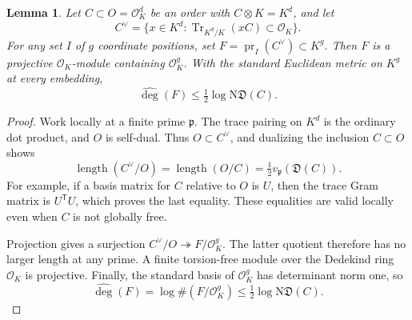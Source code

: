 \documentclass[11pt,a4paper]{article}
\newtheorem{lemma}[theorem]{Lemma}
\theoremstyle{definition}
\newcommand{\OK}{\mathcal O_K}
\newcommand{\Ardeg}{\widehat{\deg}}
\begin{document}
\begin{lemma}\label{lem:trace-lattice}
Let $C\subset O=\OK^d$ be an order with $C\otimes K=K^d$, and
let
\[
 C^\vee=\{x\in K^d:\operatorname{Tr}_{K^d/K}(xC)\subset\OK\}.
\]
For any set $I$ of $g$ coordinate positions, set
$F=\operatorname{pr}_I(C^\vee)\subset K^g$.
Then $F$ is a projective $\OK$-module containing $\OK^g$.
With the standard Euclidean metric on $K^g$ at every embedding,
\[
 \Ardeg(F)\le\tfrac12\log\mathrm N\mathfrak D(C).
\]
\end{lemma}
\begin{proof}
Work locally at a finite prime $\mathfrak p$. The trace pairing
on $K^d$ is the ordinary dot product, and $O$ is self-dual.
Thus $O\subset C^\vee$, and dualizing the inclusion $C\subset O$
shows
\[
 \operatorname{length}(C^\vee/O)
 =\operatorname{length}(O/C)
 =\tfrac12v_{\mathfrak p}(\mathfrak D(C)).
\]
For example, if a basis matrix for $C$ relative to $O$ is $U$,
then the trace Gram matrix is $U^{\mathsf T}U$, which proves the
last equality. These equalities are valid locally even when
$C$ is not globally free.

Projection gives a surjection
$C^\vee/O\twoheadrightarrow F/\OK^g$. The latter quotient
therefore has no larger length at any prime.
A finite torsion-free module over the Dedekind ring $\OK$ is
projective. Finally, the standard basis of $\OK^g$ has determinant
norm one, so
\[
 \Ardeg(F)=\log\#(F/\OK^g)
 \le\tfrac12\log\mathrm N\mathfrak D(C).
\]
\end{proof}
\end{document}
